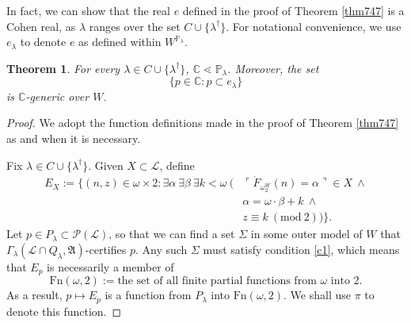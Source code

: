 \documentclass[12pt, twoside]{memoir}
\numberwithin{equation}{section}
\newtheorem{thm}{Theorem}[section]
\theoremstyle{definition}
\theoremstyle{remark}
\theoremstyle{definition}
\theoremstyle{definition}
\theoremstyle{definition}
\theoremstyle{remark}
\begin{document}
In fact, we can show that the real $e$ defined in the proof of Theorem \ref{thm747} is a Cohen real, as $\lambda$ ranges over the set $C \cup \{\lambda^{\dagger}\}$. For notational convenience, we use $e_{\lambda}$ to denote $e$ as defined within $W^{\mathbb{P}_{\lambda}}$.

\begin{thm}\label{thm7413}
For every $\lambda \in C \cup \{\lambda^{\dagger}\}$, $\mathbb{C} \lessdot \mathbb{P}_{\lambda}$. Moreover, the set
\begin{equation*}
    \{p \in \mathbb{C} : p \subset e_{\lambda}\}
\end{equation*}
is $\mathbb{C}$-generic over $W$.
\end{thm}

\begin{proof}
We adopt the function definitions made in the proof of Theorem \ref{thm747} as and when it is necessary. 

Fix $\lambda \in C \cup \{\lambda^{\dagger}\}$. Given $X \subset \mathcal{L}$, define 
\begin{align*}
    E_X := \{(n, z) \in \omega \times 2 : \exists \alpha \ \exists \beta \ \exists k < \omega \ (&\ulcorner \dot{F}_{\omega_2^W}(n) = \alpha \urcorner \in X \ \wedge \\ 
    & \alpha = \omega \cdot \beta + k \ \wedge \\
    & z \equiv k \ (\mathrm{mod} \ 2))\} \text{.}
\end{align*}
Let $p \in P_{\lambda} \subset \mathcal{P}(\mathcal{L})$, so that we can find a set $\Sigma$ in some outer model of $W$ that $\Gamma_{\lambda} (\mathcal{L} \cap Q_{\lambda}, \mathfrak{A})$-certifies $p$. Any such $\Sigma$ must satisfy condition \ref{c1}, which means that $E_p$ is necessarily a member of
\begin{equation*}
    \mathrm{Fn}(\omega, 2) := \text{the set of all finite partial functions from } \omega \text{ into } 2 \text{.}
\end{equation*}
As a result, $p \mapsto E_p$ is a function from $P_{\lambda}$ into $\mathrm{Fn}(\omega, 2)$. We shall use $\pi$ to denote this function. 


\end{proof}
\end{document}
